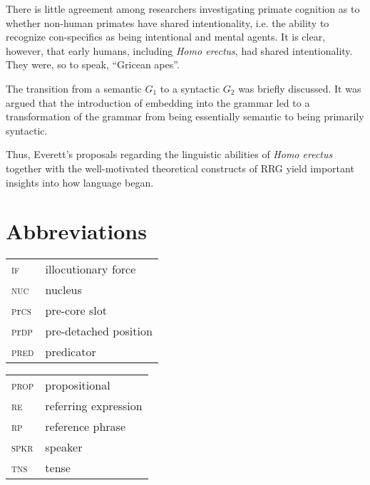 \documentclass[output=paper,colorlinks,citecolor=brown]{langscibook}
\begin{document}
There is little agreement among researchers investigating primate cognition as to whether non-human primates have shared intentionality, i.e. the ability to recognize con-specifics as being intentional and mental agents.  It is clear, however, that early humans, including \emph{Homo erectus}, had shared intentionality.  They were, so to speak, “Gricean apes”.

The transition from a semantic $G_1$ to a syntactic $G_2$ was briefly discussed.  It was argued that the introduction of embedding into the grammar led to a transformation of the grammar from being essentially semantic to being primarily syntactic.

Thus, Everett’s proposals regarding the linguistic abilities of \emph{Homo erectus} together with the well-motivated theoretical constructs of RRG yield important insights into how language began.

\section*{Abbreviations}
\begin{tabularx}{.5\textwidth}{@{}lQ}
\textsc{if} & illocutionary force \\
\textsc{nuc} & nucleus \\
\textsc{p}r\textsc{cs} & pre-core slot \\
\textsc{p}r\textsc{dp} & pre-detached position \\
\textsc{pred} & predicator \\
\end{tabularx}\begin{tabularx}{.5\textwidth}{lQ@{}}
\textsc{prop} & propositional \\
\textsc{re} & referring expression \\
\textsc{rp} & reference phrase \\
\textsc{spkr} & speaker \\
\textsc{tns} & tense \\
\end{tabularx}

\printbibliography[heading=subbibliography,notkeyword=this]
\end{document}
